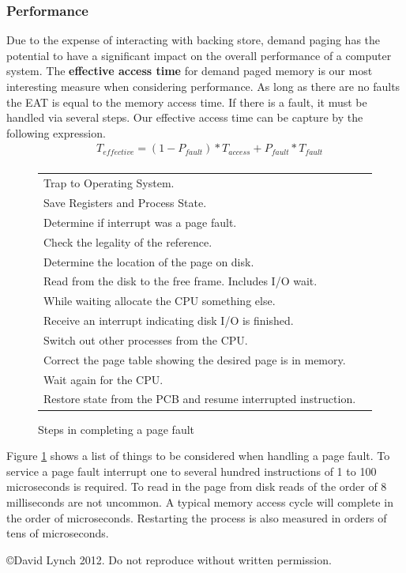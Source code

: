 \documentclass[10pt,a4paper]{article}
\begin{document}
\subsubsection{Performance}
Due to the expense of interacting with backing store, demand paging has the potential to have a significant impact on the overall performance of a computer system. The {\bf effective access time} for demand paged memory is our most interesting measure when considering performance. As long as there are no faults the EAT is equal to the memory access time. If there is a fault, it must be handled via several steps. Our effective access time can be capture by the following expression.
\begin{equation}
\begin{split}
&T_{effective} = (1 - P_{fault}) * T_{access} + P_{fault} * T_{fault}\\
\end{split}
\end{equation}
\newline\newline
\begin{figure}
\caption{Steps in completing a page fault}
\begin{center}
\begin{tabular}{| l | l | }
  \hline
  Trap to Operating System. \\
  Save Registers and Process State. \\
  Determine if interrupt was a page fault. \\
  Check the legality of the reference. \\
  Determine the location of the page on disk. \\
  Read from the disk to the free frame. Includes I/O wait. \\
  While waiting allocate the CPU something else. \\
  Receive an interrupt indicating disk I/O is finished.  \\
  Switch out other processes from the CPU. \\
  Correct the page table showing the desired page is in memory. \\
  Wait again for the CPU. \\  
  Restore state from the PCB and resume interrupted instruction. \\
  \hline
\end{tabular}
\label{pfsteps}
\end{center}
\end{figure}
Figure \ref{pfsteps} shows a list of things to be considered when handling a page fault. To service a page fault interrupt one to several hundred instructions of 1 to 100 microseconds is required. To read in the page from disk reads of the order of 8 milliseconds are not uncommon. A typical memory access cycle will complete in the order of microseconds. Restarting the process is also measured in orders of tens of microseconds.   



{}

\begin{center}
{\small \copyright  David Lynch 2012. Do not reproduce without written permission.}
\end{center}
\end{document}
